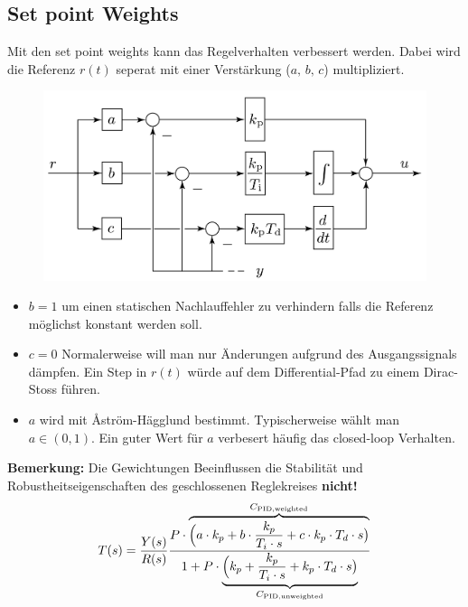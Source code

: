 \subsection{Set point Weights}
        Mit den set point weights kann das Regelverhalten verbessert werden. Dabei wird die Referenz $r(t)$ seperat mit einer Verstärkung ($a,\, b,\, c$) multipliziert.
        
        \begin{figure}[H]
            \centering
            \includegraphics[width = 0.535\linewidth]{images/04/spw.jpeg}
        \end{figure}
        
        \begin{itemize}
            \item $b=1$ um einen statischen Nachlauffehler zu verhindern falls die Referenz möglichst konstant werden soll.
            
            \item $c=0$ Normalerweise will man nur Änderungen aufgrund des Ausgangssignals dämpfen. Ein Step in $r(t)$ würde auf dem Differential-Pfad zu einem Dirac-Stoss führen.
            
            \item $a$ wird mit \r{A}ström-Hägglund bestimmt. Typischerweise wählt man $a\in(0,1)$. Ein guter Wert für $a$ verbesert häufig das closed-loop Verhalten.
        \end{itemize}
        \textbf{Bemerkung:} Die Gewichtungen Beeinflussen die Stabilität und Robustheitseigenschaften des geschlossenen Reglekreises \textbf{nicht!}
        \begin{equation*}
            T(s) = \frac{Y(s)}{R(s)}\frac{P\cdot\overbrace{\Big(a\cdot k_p +b\cdot\frac{k_p}{T_i\cdot s} + c\cdot k_p\cdot T_d\cdot s\big)}^{C_{\textnormal{PID,weighted}}}}{1 + P\cdot\underbrace{\Big(k_p + \frac{k_p}{T_i\cdot s} + k_p\cdot T_d\cdot s\big)}_{C_{\textnormal{PID,unweighted}}}}
        \end{equation*}